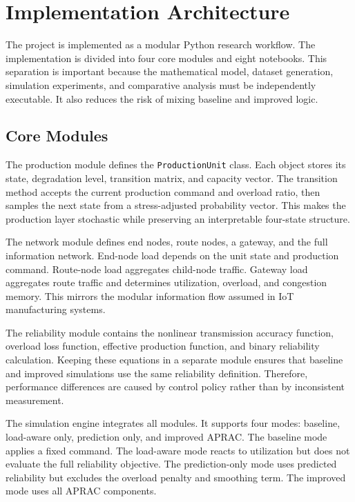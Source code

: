 \documentclass[journal]{IEEEtran}
\begin{document}
\section{Implementation Architecture}
\label{sec:implementation}

The project is implemented as a modular Python research workflow. The implementation is divided into four core modules and eight notebooks. This separation is important because the mathematical model, dataset generation, simulation experiments, and comparative analysis must be independently executable. It also reduces the risk of mixing baseline and improved logic.

\subsection{Core Modules}

The production module defines the \texttt{ProductionUnit} class. Each object stores its state, degradation level, transition matrix, and capacity vector. The transition method accepts the current production command and overload ratio, then samples the next state from a stress-adjusted probability vector. This makes the production layer stochastic while preserving an interpretable four-state structure.

The network module defines end nodes, route nodes, a gateway, and the full information network. End-node load depends on the unit state and production command. Route-node load aggregates child-node traffic. Gateway load aggregates route traffic and determines utilization, overload, and congestion memory. This mirrors the modular information flow assumed in IoT manufacturing systems.

The reliability module contains the nonlinear transmission accuracy function, overload loss function, effective production function, and binary reliability calculation. Keeping these equations in a separate module ensures that baseline and improved simulations use the same reliability definition. Therefore, performance differences are caused by control policy rather than by inconsistent measurement.

The simulation engine integrates all modules. It supports four modes: baseline, load-aware only, prediction only, and improved APRAC. The baseline mode applies a fixed command. The load-aware mode reacts to utilization but does not evaluate the full reliability objective. The prediction-only mode uses predicted reliability but excludes the overload penalty and smoothing term. The improved mode uses all APRAC components.
\end{document}
